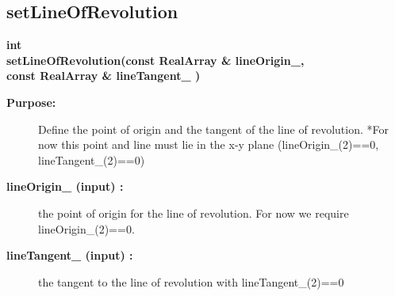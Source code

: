 \subsection{setLineOfRevolution}
 
\begin{flushleft} \textbf{%
int   \\ 
\settowidth{\RevolutionMappingIncludeArgIndent}{setLineOfRevolution(}%
setLineOfRevolution(const RealArray \& lineOrigin\_,\\ 
\hspace{\RevolutionMappingIncludeArgIndent}const RealArray \& lineTangent\_ )
}\end{flushleft}
\begin{description}
\item[{\bf Purpose:}]  Define the point of origin and the tangent of the line of revolution. 
 *For now this point and line must
    lie in the x-y plane (lineOrigin\_(2)==0, lineTangent\_(2)==0)
\item[{\bf lineOrigin\_ (input) :}]  the point of origin for the line of revolution. For
    now we require lineOrigin\_(2)==0.
\item[{\bf lineTangent\_ (input) :}]  the tangent to the line of revolution with lineTangent\_(2)==0
\end{description}
